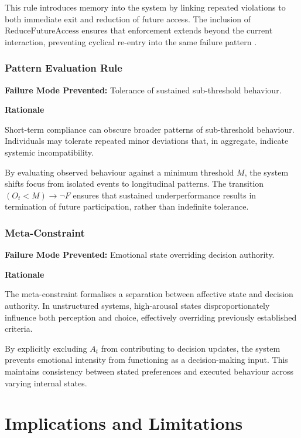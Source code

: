 \documentclass{article}
\begin{document}
	This rule introduces memory into the system by linking repeated violations to both immediate exit and reduction of future access. The inclusion of $\text{ReduceFutureAccess}$ ensures that enforcement extends beyond the current interaction, preventing cyclical re-entry into the same failure pattern \cite{delayed_enforcement}.
	
	\subsubsection*{Pattern Evaluation Rule}
	
	\textbf{Failure Mode Prevented:} Tolerance of sustained sub-threshold behaviour.
	
	\textbf{Rationale}
	
	Short-term compliance can obscure broader patterns of sub-threshold behaviour. Individuals may tolerate repeated minor deviations that, in aggregate, indicate systemic incompatibility.
	
	By evaluating observed behaviour against a minimum threshold $M$, the system shifts focus from isolated events to longitudinal patterns. The transition $(O_t < M) \rightarrow \neg F$ ensures that sustained underperformance results in termination of future participation, rather than indefinite tolerance.
	
	\subsubsection*{Meta-Constraint}
	
	\textbf{Failure Mode Prevented:} Emotional state overriding decision authority.
	
	\textbf{Rationale}
	
	The meta-constraint formalises a separation between affective state and decision authority. In unstructured systems, high-arousal states disproportionately influence both perception and choice, effectively overriding previously established criteria.
	
	By explicitly excluding $A_t$ from contributing to decision updates, the system prevents emotional intensity from functioning as a decision-making input. This maintains consistency between stated preferences and executed behaviour across varying internal states.
	
	\section*{Implications and Limitations}
	
\end{document}
